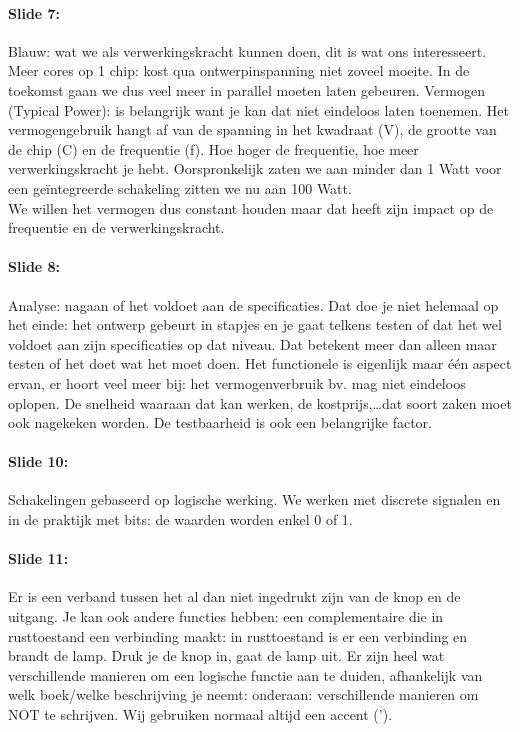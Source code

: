 \documentclass[10pt,a4paper]{book}
\begin{document}
\paragraph{Slide 7:} Blauw: wat we als verwerkingskracht kunnen doen, dit is wat ons interesseert. Meer cores op 1 chip: kost qua ontwerpinspanning niet zoveel moeite. In de toekomst gaan we dus veel meer in parallel moeten laten gebeuren. Vermogen (Typical Power): is belangrijk want je kan dat niet eindeloos laten toenemen. Het vermogengebruik hangt af van de spanning in het kwadraat (V), de grootte van de chip (C) en de frequentie (f). Hoe hoger de frequentie, hoe meer verwerkingskracht je hebt. Oorspronkelijk zaten we aan minder dan 1 Watt voor een ge\"integreerde schakeling zitten we nu aan 100 Watt. \\
We willen het vermogen dus constant houden maar dat heeft zijn impact op de frequentie en de verwerkingskracht. 

\paragraph{Slide 8:} Analyse: nagaan of het voldoet aan de specificaties. Dat doe je niet helemaal op het einde: het ontwerp gebeurt in stapjes en je gaat telkens testen of dat het wel voldoet aan zijn specificaties op dat niveau. Dat betekent meer dan alleen maar testen of het doet wat het moet doen. Het functionele is eigenlijk maar \'e\'en aspect ervan, er hoort veel meer bij: het vermogenverbruik bv. mag niet eindeloos oplopen. De snelheid waaraan dat kan werken, de kostprijs,\ldots dat soort zaken moet ook nagekeken worden. De testbaarheid is ook een belangrijke factor.

\paragraph{Slide 10:} Schakelingen gebaseerd op logische werking. We werken met discrete signalen en in de praktijk met bits: de waarden worden enkel 0 of 1. 

\paragraph{Slide 11:} Er is een verband tussen het al dan niet ingedrukt zijn van de knop en de uitgang. Je kan ook andere functies hebben: een complementaire die in rusttoestand een verbinding maakt: in rusttoestand is er een verbinding en brandt de lamp. Druk je de knop in, gaat de lamp uit. Er zijn heel wat verschillende manieren om een logische functie aan te duiden, afhankelijk van welk boek/welke beschrijving je neemt: onderaan: verschillende manieren om NOT te schrijven. Wij gebruiken normaal altijd een accent (').
\end{document}
